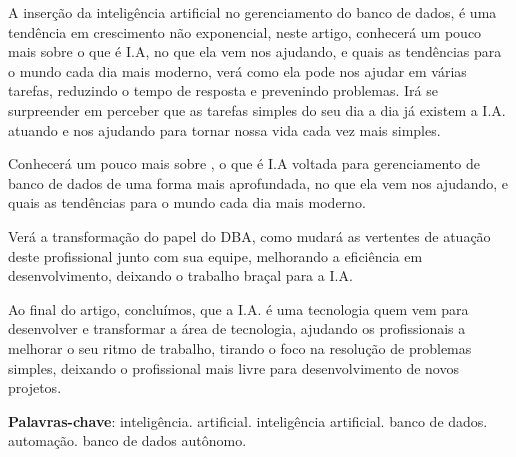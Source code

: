 \documentclass[
	12pt,
	openright,		
	twoside,
	a4paper,
	english,
	brazil,
	]{abntex2}
\begin{document}
\frenchspacing 				%

\pretextual

\imprimircapa
\imprimirfolhaderosto

\setlength{\absparsep}{18pt} %
\begin{resumo}

A inserção da inteligência artificial no gerenciamento do banco de dados, é uma tendência em crescimento não exponencial, neste artigo,  conhecerá um pouco mais sobre  o que é I.A, no que ela vem nos ajudando, e quais as tendências para o mundo cada dia mais moderno, verá como ela pode nos  ajudar em várias tarefas, reduzindo o tempo de resposta e prevenindo problemas.  Irá se surpreender em perceber que as tarefas simples do seu dia a dia já existem a I.A. atuando e nos ajudando para tornar nossa vida cada vez mais simples. 

Conhecerá um pouco mais sobre , o que é I.A voltada para gerenciamento de banco de dados de uma forma mais aprofundada, no que ela vem nos ajudando, e quais as tendências para o mundo cada dia mais moderno.

Verá a transformação do papel do DBA, como mudará as vertentes de atuação deste profissional junto com sua equipe, melhorando a eficiência em desenvolvimento, deixando o trabalho braçal para a I.A.

Ao final do artigo, concluímos, que a I.A. é uma tecnologia quem vem para desenvolver e transformar a área de tecnologia, ajudando os profissionais a melhorar o seu ritmo de trabalho, tirando o foco na resolução de problemas simples, deixando o profissional mais livre para desenvolvimento de novos projetos.

\textbf{Palavras-chave}: inteligência. artificial. inteligência artificial. banco de dados. automação. banco de dados autônomo.
\end{resumo}


\tableofcontents*
\cleardoublepage

\textual






\postextual

\end{document}
